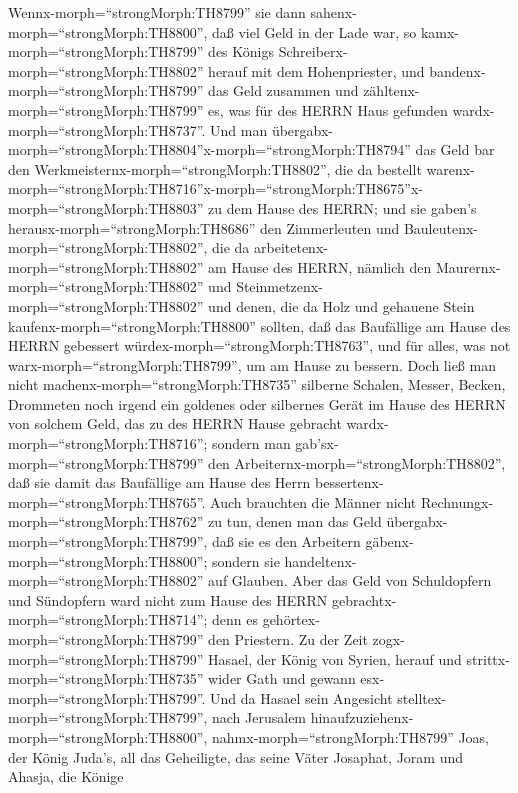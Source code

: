 Wennx-morph=``strongMorph:TH8799'' sie dann
sahenx-morph=``strongMorph:TH8800'', daß viel Geld in der Lade war, so
kamx-morph=``strongMorph:TH8799'' des Königs
Schreiberx-morph=``strongMorph:TH8802'' herauf mit dem Hohenpriester,
und bandenx-morph=``strongMorph:TH8799'' das Geld zusammen und
zähltenx-morph=``strongMorph:TH8799'' es, was für des HERRN Haus
gefunden wardx-morph=``strongMorph:TH8737''.  Und man
übergabx-morph=``strongMorph:TH8804''x-morph=``strongMorph:TH8794'' das
Geld bar den Werkmeisternx-morph=``strongMorph:TH8802'', die da bestellt
warenx-morph=``strongMorph:TH8716''\textbar x-morph=``strongMorph:TH8675''x-morph=``strongMorph:TH8803''
zu dem Hause des HERRN; und sie gaben's
herausx-morph=``strongMorph:TH8686'' den Zimmerleuten und
Bauleutenx-morph=``strongMorph:TH8802'', die da
arbeitetenx-morph=``strongMorph:TH8802'' am Hause des HERRN,
 nämlich den Maurernx-morph=``strongMorph:TH8802'' und
Steinmetzenx-morph=``strongMorph:TH8802'' und denen, die da Holz und
gehauene Stein kaufenx-morph=``strongMorph:TH8800'' sollten, daß das
Baufällige am Hause des HERRN gebessert
würdex-morph=``strongMorph:TH8763'', und für alles, was not
warx-morph=``strongMorph:TH8799'', um am Hause zu bessern. 
Doch ließ man nicht machenx-morph=``strongMorph:TH8735'' silberne
Schalen, Messer, Becken, Drommeten noch irgend ein goldenes oder
silbernes Gerät im Hause des HERRN von solchem Geld, das zu des HERRN
Hause gebracht wardx-morph=``strongMorph:TH8716'';  sondern
man gab'sx-morph=``strongMorph:TH8799'' den
Arbeiternx-morph=``strongMorph:TH8802'', daß sie damit das Baufällige am
Hause des Herrn bessertenx-morph=``strongMorph:TH8765''. 
Auch brauchten die Männer nicht Rechnungx-morph=``strongMorph:TH8762''
zu tun, denen man das Geld übergabx-morph=``strongMorph:TH8799'', daß
sie es den Arbeitern gäbenx-morph=``strongMorph:TH8800''; sondern sie
handeltenx-morph=``strongMorph:TH8802'' auf Glauben.  Aber
das Geld von Schuldopfern und Sündopfern ward nicht zum Hause des HERRN
gebrachtx-morph=``strongMorph:TH8714''; denn es
gehörtex-morph=``strongMorph:TH8799'' den Priestern.  Zu
der Zeit zogx-morph=``strongMorph:TH8799'' Hasael, der König von Syrien,
herauf und strittx-morph=``strongMorph:TH8735'' wider Gath und gewann
esx-morph=``strongMorph:TH8799''. Und da Hasael sein Angesicht
stelltex-morph=``strongMorph:TH8799'', nach Jerusalem
hinaufzuziehenx-morph=``strongMorph:TH8800'', 
nahmx-morph=``strongMorph:TH8799'' Joas, der König Juda's, all das
Geheiligte, das seine Väter Josaphat, Joram und Ahasja, die Könige
